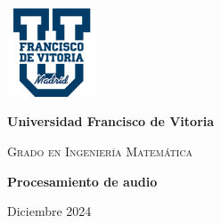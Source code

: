 
\begin{titlepage}
    \begin{center}
        \justify
        \vspace{1cm}
        
        \includegraphics[width=0.2\textwidth]{ImagenesLatex/ufv_logo}
        \vspace{1cm}
        
        \LARGE\textbf{Universidad Francisco de Vitoria}
        \vspace{0.5cm}
        
        \Large\textsc{Grado en Ingeniería Matemática}
        \vspace{1cm}
        
        
        \Huge\textbf{Procesamiento de audio}


        \Large\textmd{Diciembre 2024}
        \vfill
        
    \end{center}
\end{titlepage}
